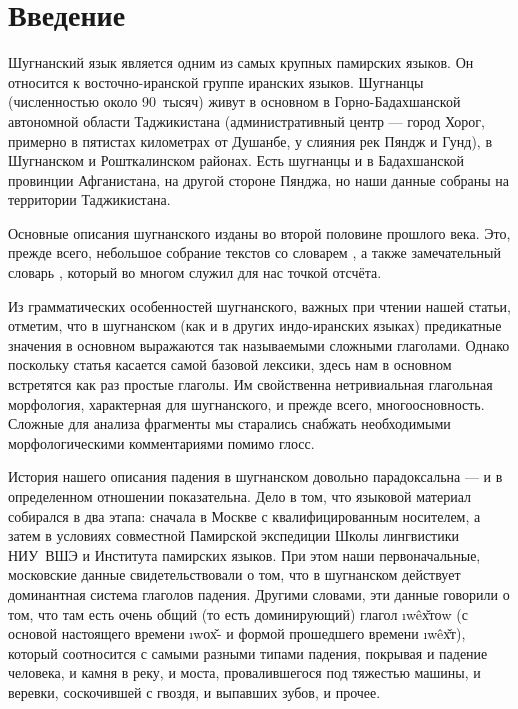 \begin{initialprint}
\end{initialprint}

\section{Введение} \label{down-intro}

Шугнанский язык является одним из самых крупных памирских языков. Он относится к восточно-иранской группе иранских языков. Шугнанцы (численностью около 90~тысяч) живут в основном в Горно-Бадахшанской автономной области Таджикистана (административный центр — город Хорог, примерно в пятистах километрах от Душанбе, у слияния рек Пяндж и Гунд), в Шугнанском и Рошткалинском районах. Есть шугнанцы и в Бадахшанской провинции Афганистана, на другой стороне Пянджа, но наши данные собраны на территории Таджикистана.

Основные описания шугнанского изданы во второй половине прошлого века. Это, прежде всего, небольшое собрание текстов со словарем \parencite{zarubin1960}, а также замечательный словарь \parencite{karamshoev1988}, который во многом служил для нас точкой отсчёта.

Из грамматических особенностей шугнанского, важных при чтении нашей статьи, отметим, что в шугнанском (как и в других индо-иранских языках) предикатные значения в основном выражаются так называемыми сложными глаголами. Однако поскольку статья касается самой базовой лексики, здесь нам в основном встретятся как раз простые глаголы. Им свойственна нетривиальная глагольная морфология, характерная для шугнанского, и прежде всего, многоосновность. Сложные для анализа фрагменты мы старались снабжать необходимыми морфологическими комментариями помимо глосс.

История нашего описания падения в шугнанском довольно парадоксальна — и в определенном отношении показательна. Дело в том, что языковой материал собирался в два этапа: сначала в Москве с квалифицированным носителем, а затем в условиях совместной Памирской экспедиции Школы лингвистики НИУ~ВШЭ и Института памирских языков. При этом наши первоначальные, московские данные свидетельствовали о том, что в шугнанском действует доминантная система глаголов падения. Другими словами, эти данные говорили о том, что там есть очень общий (то есть доминирующий) глагол \i{wêх̌тоw} (с основой настоящего времени \i{wох̌}- и формой прошедшего времени \i{wêх̌т}), который соотносится с самыми разными типами падения, покрывая и падение человека, и камня в реку, и моста, провалившегося под тяжестью машины, и веревки, соскочившей с гвоздя, и выпавших зубов, и прочее.


